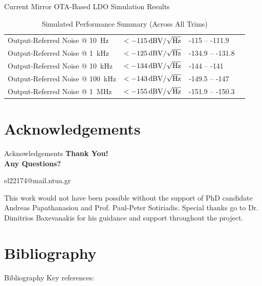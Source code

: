 \documentclass[10pt, aspectratio=169]{beamer}
\begin{document}
\begin{frame}{Current Mirror OTA-Based LDO Simulation Results}
\begin{table}[t]
\begin{tabularx}{\textwidth}{@{} X X @{} X X @{}}
            Output-Referred Noise @ \qty{10}{\hertz} & $<-\qty{115}{\decibel\volt\slash\sqrt{\Hz}}$ & -115 -- -111.9 \\
            Output-Referred Noise @ \qty{1}{\kilo\hertz} & $<-\qty{125}{\decibel\volt\slash\sqrt{\Hz}}$ & -134.9 -- -131.8 \\
            Output-Referred Noise @ \qty{10}{\kilo\hertz} & $<-\qty{134}{\decibel\volt\slash\sqrt{\Hz}}$ & -144 -- -141 \\
            Output-Referred Noise @ \qty{100}{\kilo\hertz} & $<-\qty{143}{\decibel\volt\slash\sqrt{\Hz}}$ & -149.5 -- -147 \\
            Output-Referred Noise @ \qty{1}{\mega\hertz} & $<-\qty{155}{\decibel\volt\slash\sqrt{\Hz}}$ & -151.9 -- -150.3 \\
            \bottomrule
        \end{tabularx}
        \caption{Simulated Performance Summary (Across All Trims)}
    \end{table}
\end{frame}

\section{Acknowledgements}
\begin{frame}{Acknowledgements}
    \vspace{1em}
    \centering
    \Large
    \textbf{Thank You! \\[0.5em] Any Questions?}
    \normalsize
    \vspace{0.5em}
    
    el22174@mail.ntua.gr
    
    \vspace{1.5em}
    
    \normalsize
    This work would not have been possible without the support of PhD candidate Andreas Papathanasiou and Prof. Paul-Peter Sotiriadis. Special thanks go to Dr. Dimitrios Baxevanakis for his guidance and support throughout the project.
\end{frame}

\section{Bibliography}
\begin{frame}{Bibliography}
    \footnotesize
    Key references: \cite{1,pretl2026,2}
    \vspace{0.5em}
    
\end{frame}
\end{document}
